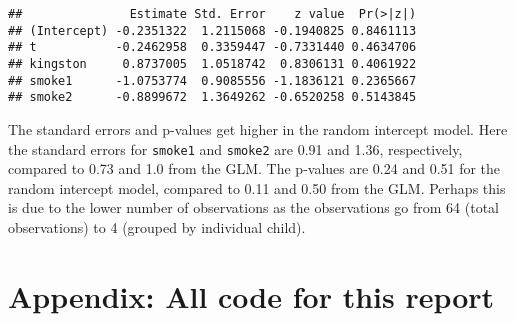 \documentclass[
]{article}
\begin{document}
\begin{verbatim}
##               Estimate Std. Error    z value  Pr(>|z|)
## (Intercept) -0.2351322  1.2115068 -0.1940825 0.8461113
## t           -0.2462958  0.3359447 -0.7331440 0.4634706
## kingston     0.8737005  1.0518742  0.8306131 0.4061922
## smoke1      -1.0753774  0.9085556 -1.1836121 0.2365667
## smoke2      -0.8899672  1.3649262 -0.6520258 0.5143845
\end{verbatim}

The standard errors and p-values get higher in the random intercept
model. Here the standard errors for \texttt{smoke1} and \texttt{smoke2}
are 0.91 and 1.36, respectively, compared to 0.73 and 1.0 from the GLM.
The p-values are 0.24 and 0.51 for the random intercept model, compared
to 0.11 and 0.50 from the GLM. Perhaps this is due to the lower number
of observations as the observations go from 64 (total observations) to 4
(grouped by individual child).

\hypertarget{appendix-all-code-for-this-report}{%
\section{Appendix: All code for this
report}\label{appendix-all-code-for-this-report}}
\end{document}
